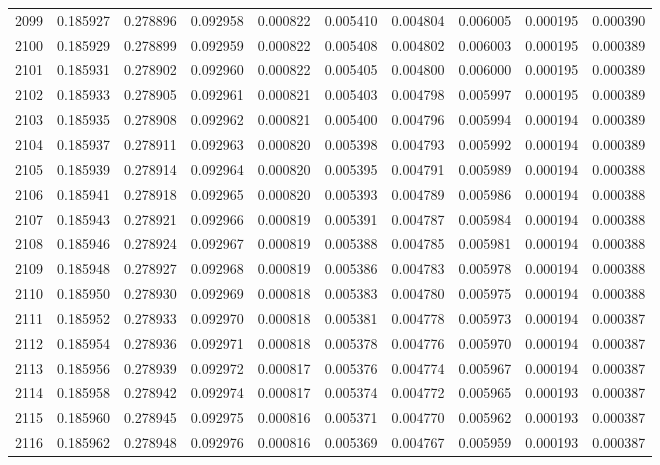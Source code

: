 \begin{tabular}{lrrrrrrrrr}
2099 & 0.185927 & 0.278896 & 0.092958 & 0.000822 & 0.005410 & 0.004804 & 0.006005 & 0.000195 & 0.000390 \\
2100 & 0.185929 & 0.278899 & 0.092959 & 0.000822 & 0.005408 & 0.004802 & 0.006003 & 0.000195 & 0.000389 \\
2101 & 0.185931 & 0.278902 & 0.092960 & 0.000822 & 0.005405 & 0.004800 & 0.006000 & 0.000195 & 0.000389 \\
2102 & 0.185933 & 0.278905 & 0.092961 & 0.000821 & 0.005403 & 0.004798 & 0.005997 & 0.000195 & 0.000389 \\
2103 & 0.185935 & 0.278908 & 0.092962 & 0.000821 & 0.005400 & 0.004796 & 0.005994 & 0.000194 & 0.000389 \\
2104 & 0.185937 & 0.278911 & 0.092963 & 0.000820 & 0.005398 & 0.004793 & 0.005992 & 0.000194 & 0.000389 \\
2105 & 0.185939 & 0.278914 & 0.092964 & 0.000820 & 0.005395 & 0.004791 & 0.005989 & 0.000194 & 0.000388 \\
2106 & 0.185941 & 0.278918 & 0.092965 & 0.000820 & 0.005393 & 0.004789 & 0.005986 & 0.000194 & 0.000388 \\
2107 & 0.185943 & 0.278921 & 0.092966 & 0.000819 & 0.005391 & 0.004787 & 0.005984 & 0.000194 & 0.000388 \\
2108 & 0.185946 & 0.278924 & 0.092967 & 0.000819 & 0.005388 & 0.004785 & 0.005981 & 0.000194 & 0.000388 \\
2109 & 0.185948 & 0.278927 & 0.092968 & 0.000819 & 0.005386 & 0.004783 & 0.005978 & 0.000194 & 0.000388 \\
2110 & 0.185950 & 0.278930 & 0.092969 & 0.000818 & 0.005383 & 0.004780 & 0.005975 & 0.000194 & 0.000388 \\
2111 & 0.185952 & 0.278933 & 0.092970 & 0.000818 & 0.005381 & 0.004778 & 0.005973 & 0.000194 & 0.000387 \\
2112 & 0.185954 & 0.278936 & 0.092971 & 0.000818 & 0.005378 & 0.004776 & 0.005970 & 0.000194 & 0.000387 \\
2113 & 0.185956 & 0.278939 & 0.092972 & 0.000817 & 0.005376 & 0.004774 & 0.005967 & 0.000194 & 0.000387 \\
2114 & 0.185958 & 0.278942 & 0.092974 & 0.000817 & 0.005374 & 0.004772 & 0.005965 & 0.000193 & 0.000387 \\
2115 & 0.185960 & 0.278945 & 0.092975 & 0.000816 & 0.005371 & 0.004770 & 0.005962 & 0.000193 & 0.000387 \\
2116 & 0.185962 & 0.278948 & 0.092976 & 0.000816 & 0.005369 & 0.004767 & 0.005959 & 0.000193 & 0.000387 \\

\end{tabular}

